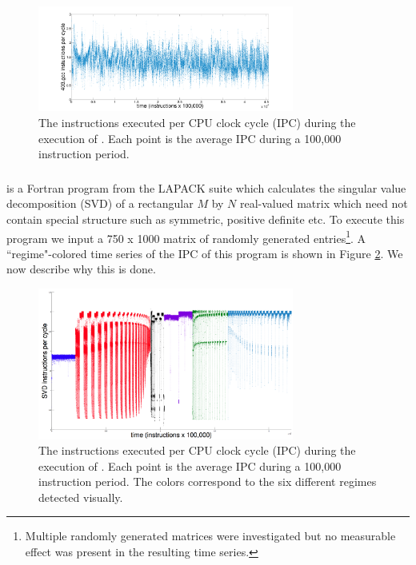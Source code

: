   \begin{figure}[t]
  \centering
    \includegraphics[width=0.75\textwidth]{figs/gccfullts}
    \caption{The instructions executed per CPU clock cycle (IPC) during the execution of \gcc. Each point is the average IPC during a 100,000 instruction period.}
    \label{fig:gcc-ts}
  \end{figure}

\subsubsection{\svd}

\svd is a Fortran program from the LAPACK suite \cite{lapack} which calculates the singular value decomposition (SVD) of a rectangular $M$ by $N$  real-valued matrix which need not contain special structure such as symmetric, positive definite etc. To execute this program we input a 750 x 1000 matrix of randomly generated entries\footnote{Multiple randomly generated matrices were investigated but no measurable effect was present in the resulting time series.}. A ``regime"-colored time series of the IPC of this program is shown in Figure \ref{fig:svd-ts-colored}. We now describe why this is done.

\begin{figure}[t]
    \centering
    \includegraphics[width=0.75\textwidth]{figs/SVD1RegimesColored}
    \caption{The instructions executed per CPU clock cycle (IPC) during the execution of \svd. Each point is the average IPC during a 100,000 instruction period. The colors correspond to the six different regimes detected visually.}
    \label{fig:svd-ts-colored}
  \end{figure}

